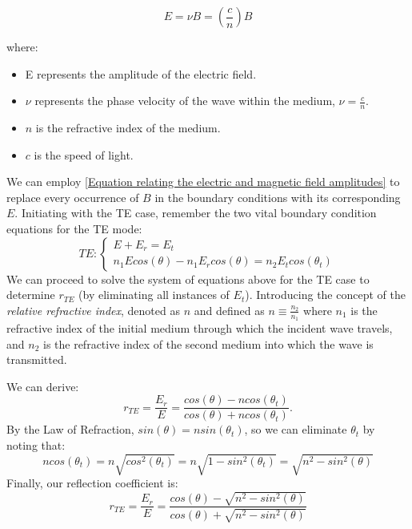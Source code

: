 \begin{equation} \label{Equation relating the electric and magnetic field amplitudes}
E = \nu B = \left(\frac{c}{n}\right)B
\end{equation}

where:
\begin{itemize}
    \item E represents the amplitude of the electric field.
    \item $\nu$ represents the phase velocity of the wave within the medium, $\nu=\frac{c}{n}$.
    \item $n$ is the refractive index of the medium.
    \item $c$ is the speed of light.
\end{itemize}

We can employ \ref{Equation relating the electric and magnetic field amplitudes} to replace every occurrence of $B$ in the boundary conditions with its corresponding $E$. Initiating with the TE case, remember the two vital boundary condition equations for the TE mode:
\begin{equation}
TE:
\begin{cases} \label{TE boundary conditions}
  E + E_r = E_t \\
  n_1Ecos(\theta) - n_1E_rcos(\theta) = n_2E_tcos(\theta_t)
\end{cases}
\end{equation}
We can proceed to solve the system of equations above for the TE case to determine $r_{TE}$ (by eliminating all instances of $E_t$). Introducing the concept of the \textit{relative refractive index}, denoted as $n$ and defined as $n \equiv \frac{n_2}{n_1}$ where $n_1$ is the refractive index of the initial medium through which the incident wave travels, and $n_2$ is the refractive index of the second medium into which the wave is transmitted.

We can derive:
\begin{equation} \label{Reflection coefficient (TE) in terms of n}
r_{TE} = \frac{E_r}{E} = \frac{cos(\theta) - ncos(\theta_t)}{cos(\theta) + ncos(\theta_t)}.
\end{equation}
By the Law of Refraction, $sin(\theta) = nsin(\theta_t)$, so we can eliminate $\theta_t$ by noting that:
\begin{equation} \label{Replacing \theta_t using the law of refraction}
ncos(\theta_t) = n \sqrt{cos^{2}(\theta_t)} = n\sqrt{1 - sin^2(\theta_t)} = \sqrt{n^2 - sin^2(\theta)}
\end{equation}
Finally, our reflection coefficient is:
\begin{equation} \label{eq:reflection_TE}
r_{TE} = \frac{E_r}{E} = \frac{cos(\theta) - \sqrt{n^2 - sin^2(\theta)}}{cos(\theta) + \sqrt{n^2 - sin^2(\theta)}}
\end{equation}

